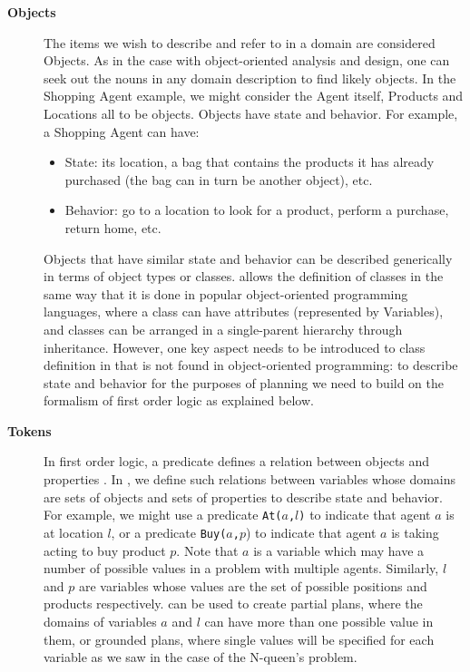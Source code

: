 \begin{description}
\item[\textbf{Objects}] The items we wish to describe and refer to in
  a domain are considered Objects. As in the case with object-oriented
  analysis and design, one can seek out the nouns in any domain
  description to find likely objects. In the Shopping Agent example,
  we might consider the Agent itself, Products and Locations all to be
  objects. Objects have state and behavior. For example, a Shopping
  Agent can have:

  \begin{itemize}

  \item State: its location, a bag that contains the products it has
    already purchased (the bag can in turn be another object), etc.

  \item Behavior: go to a location to look for a product, perform a
    purchase, return home, etc.

  \end{itemize}

  Objects that have similar state and behavior can be described
  generically in terms of object types or classes. \eu allows the
  definition of classes in the same way that it is done in popular
  object-oriented programming languages, where a class can have
  attributes (represented by Variables), and classes can be arranged
  in a single-parent hierarchy through inheritance.  However, one key
  aspect needs to be introduced to class definition in \eu that is not
  found in object-oriented programming: to describe state and behavior
  for the purposes of planning we need to build on the formalism of
  first order logic as explained below.

\item[\textbf{Tokens}] In first order logic, a predicate defines a
  relation between objects and properties \cite{gen87}.  In \eu, we
  define such relations between variables whose domains are sets of
  objects and sets of properties to describe state and behavior. For
  example, we might use a predicate \texttt{At($a$,$l$)} to indicate
  that agent $a$ is at location $l$, or a predicate
  \texttt{Buy($a$,$p$}) to indicate that agent $a$ is taking acting to
  buy product $p$. Note that $a$ is a variable which may have a number
  of possible values in a problem with multiple agents. Similarly, $l$
  and $p$ are variables whose values are the set of possible positions
  and products respectively. \eu can be used to create partial plans,
  where the domains of variables $a$ and $l$ can have more than one
  possible value in them, or grounded plans, where single values will
  be specified for each variable as we saw in the case of the
  N-queen's problem.


\end{description}

